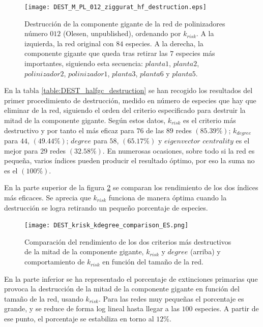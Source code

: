 \begin{figure}[h!]
\centering
\texttt{[image: DEST\_M\_PL\_012\_ziggurat\_hf\_destruction.eps]}
\caption {Destrucción de la componente gigante de la red de polinizadores número $012$ (Olesen, unpublished), ordenando por $k_{risk}$. A la izquierda, la red original con $84$ especies. A la derecha, la componente gigante que queda tras retirar las $7$ especies más importantes, siguiendo esta secuencia: $planta1$, $planta2$, $polinizador2$, $polinizador1$, $planta3$, $planta6$ y $planta5$.}
\label{fig:DEST_M_PL_012_ziggurat_hf_destruction}
\end{figure}

En la tabla \ref{table:DEST_halfgc_destruction} se han recogido los resultados del primer procedimiento de destrucción, medido en número de especies que hay que eliminar de la red, siguiendo el orden del criterio especificado para destruir la mitad de la componente gigante. Según estos datos, $k_{risk}$ es el criterio más destructivo y por tanto el más eficaz para $76$ de las $89$ redes $(85.39\%)$; $k_{degree}$ para $44$, $(49.44\%)$; $degree$ para $58$, $(65.17\%)$ y
$eigenvector$ $centrality$ es el mejor para $29$ redes $(32.58\%)$. En numerosas ocasiones, sobre todo si la red es pequeña, varios índices pueden producir el
resultado óptimo, por eso la suma no es el $(100\%)$.

En la parte superior de la figura \ref{fig:DEST_krisk_kdegree_comparison_ES} se comparan los rendimiento de los dos índices más eficaces. Se aprecia que ${k}_{risk}$ funciona de manera óptima cuando la destrucción se logra retirando un pequeño porcentaje de especies.

\clearpage
\begin{figure}[h!]
\centering
\texttt{[image: DEST\_krisk\_kdegree\_comparison\_ES.png]}
\caption {Comparación del rendimiento de los dos criterios más destructivos de la mitad de la componente gigante, $k_{risk}$ y $degree$ (arriba) y comportamiento de ${k}_{risk}$ en función del tamaño de la red.}
\label{fig:DEST_krisk_kdegree_comparison_ES}
\end{figure}

En la parte inferior se ha representado el porcentaje de extinciones primarias que provoca la destrucción de la mitad de la componente gigante en función del tamaño de la red, usando ${k}_{risk}$. Para las redes muy pequeñas el porcentaje es grande, y se reduce de forma log lineal hasta llegar a las $100$ especies. A partir de ese punto, el porcentaje se estabiliza en torno al $12\%$.



